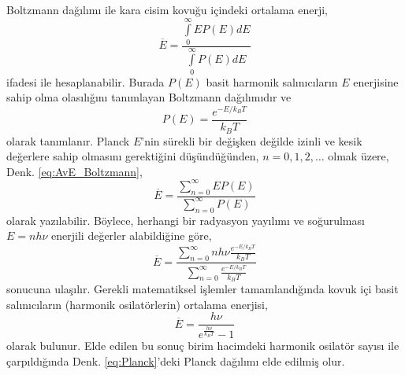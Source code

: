 \documentclass[a4paper,12pt, twoside]{article}
\begin{document}
Boltzmann dağılımı ile kara cisim kovuğu içindeki ortalama enerji,
\begin{equation}
\label{eq:AvE_Boltzmann}
\overline E =\frac{\int \limits_0^\infty E P(E) dE}{\int \limits_0^\infty P(E) dE} 
\end{equation} 
ifadesi ile hesaplanabilir. Burada $P(E)$ basit harmonik salınıcıların $E$ enerjisine sahip olma olasılığını tanımlayan Boltzmann dağılımıdır ve
\begin{equation}
\label{eq:Boltzmann}
P(E) = \frac{e^{-E/k_BT}}{k_BT}
\end{equation} 
olarak tanımlanır. Planck $E$'nin sürekli bir değişken değilde izinli ve kesik değerlere sahip olmasını gerektiğini düşündüğünden, $n = 0, 1, 2, \dots$  olmak üzere, Denk. \ref{eq:AvE_Boltzmann},
\begin{equation}
\label{eq:Boltzmann_Planck}
\overline E =\frac{\sum \limits_{n=0}^\infty E P(E)}{\sum \limits_{n=0}^\infty P(E)} 
\end{equation}
olarak yazılabilir. Böylece, herhangi bir radyasyon yayılımı ve soğurulması $E=nh\nu$ enerjili değerler alabildiğine göre,
\begin{equation}
\label{eq:Boltzmann_Planck}
\overline E =\frac{\sum \limits_{n=0}^\infty nh\nu \frac{e^{-E/k_BT}}{k_BT}}{\sum \limits_{n=0}^\infty \frac{e^{-E/k_BT}}{k_BT}} 
\end{equation}
sonucuna ulaşılır. Gerekli matematiksel işlemler tamamlandığında \cite{book:EisbergResnick} kovuk içi basit salınıcıların (harmonik osilatörlerin) ortalama enerjisi,
\begin{equation}
\label{eq:Planck_Av_E}
\overline E = \frac{h\nu}{e^{\frac{h \nu}{k_{B} T}} - 1}
\end{equation}
olarak bulunur. Elde edilen bu sonuç birim hacimdeki harmonik osilatör sayısı ile çarpıldığında Denk. \ref{eq:Planck}'deki Planck dağılımı elde edilmiş olur. 
\end{document}
